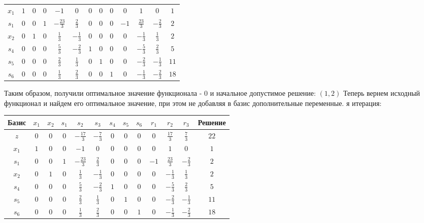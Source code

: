 \documentclass{article}%
\begin{document}
\begin{flushleft}
\begin{tabular}{|c|ccccccccccc|c|}
\hline%
$x_{1}$&$1$&$0$&$0$&$-1$&$0$&$0$&$0$&$0$&$0$&$1$&$0$&$1$\\%
$s_{1}$&$0$&$0$&$1$&$-\frac{23}{3}$&$\frac{2}{3}$&$0$&$0$&$0$&$-1$&$\frac{23}{3}$&$-\frac{2}{3}$&$2$\\%
$x_{2}$&$0$&$1$&$0$&$\frac{1}{3}$&$-\frac{1}{3}$&$0$&$0$&$0$&$0$&$-\frac{1}{3}$&$\frac{1}{3}$&$2$\\%
$s_{4}$&$0$&$0$&$0$&$\frac{5}{3}$&$-\frac{2}{3}$&$1$&$0$&$0$&$0$&$-\frac{5}{3}$&$\frac{2}{3}$&$5$\\%
$s_{5}$&$0$&$0$&$0$&$\frac{2}{3}$&$\frac{1}{3}$&$0$&$1$&$0$&$0$&$-\frac{2}{3}$&$-\frac{1}{3}$&$11$\\%
$s_{6}$&$0$&$0$&$0$&$\frac{1}{3}$&$\frac{2}{3}$&$0$&$0$&$1$&$0$&$-\frac{1}{3}$&$-\frac{2}{3}$&$18$\\%
\hline%
\end{tabular}%
\newline%
\newline%
Таким образом, получили оптимальное значение функционала {-} 0 и начальное допустимое решение: %
$(1, 2)$%
\newline%
Теперь вернем исходный функционал и найдем его оптимальное значение, при этом не добавляя в базис дополнительные переменные.%
я итерация: %
\newline%
\newline%
\renewcommand{\arraystretch}{1.3}%
\begin{tabular}{|c|ccccccccccc|c|}%
\hline%
Базис&$x_{1}$&$x_{2}$&$s_{1}$&$s_{2}$&$s_{3}$&$s_{4}$&$s_{5}$&$s_{6}$&$r_{1}$&$r_{2}$&$r_{3}$&Решение\\%
\hline%
$z$&$0$&$0$&$0$&$-\frac{17}{3}$&$-\frac{7}{3}$&$0$&$0$&$0$&$0$&$\frac{17}{3}$&$\frac{7}{3}$&$22$\\%
\hline%
$x_{1}$&$1$&$0$&$0$&$-1$&$0$&$0$&$0$&$0$&$0$&$1$&$0$&$1$\\%
$s_{1}$&$0$&$0$&$1$&$-\frac{23}{3}$&$\frac{2}{3}$&$0$&$0$&$0$&$-1$&$\frac{23}{3}$&$-\frac{2}{3}$&$2$\\%
$x_{2}$&$0$&$1$&$0$&$\frac{1}{3}$&$-\frac{1}{3}$&$0$&$0$&$0$&$0$&$-\frac{1}{3}$&$\frac{1}{3}$&$2$\\%
$s_{4}$&$0$&$0$&$0$&$\frac{5}{3}$&$-\frac{2}{3}$&$1$&$0$&$0$&$0$&$-\frac{5}{3}$&$\frac{2}{3}$&$5$\\%
$s_{5}$&$0$&$0$&$0$&$\frac{2}{3}$&$\frac{1}{3}$&$0$&$1$&$0$&$0$&$-\frac{2}{3}$&$-\frac{1}{3}$&$11$\\%
$s_{6}$&$0$&$0$&$0$&$\frac{1}{3}$&$\frac{2}{3}$&$0$&$0$&$1$&$0$&$-\frac{1}{3}$&$-\frac{2}{3}$&$18$\\%

\end{tabular}
\end{flushleft}
\end{document}
